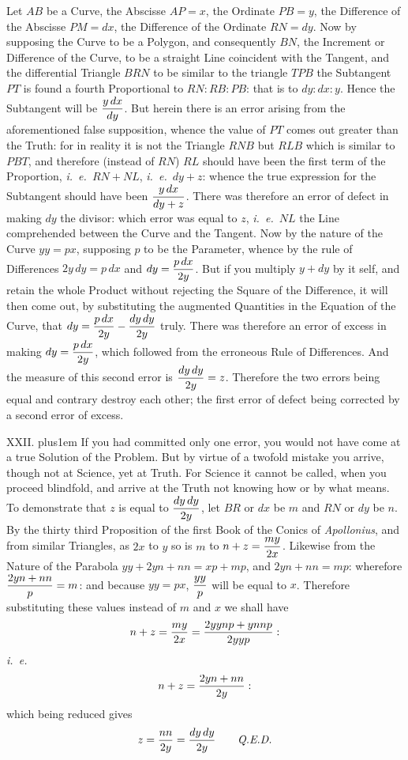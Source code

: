 \noindent
Let $AB$ be a Curve, the Abscisse $AP = x$, the
Ordinate $PB = y$, the Difference of the Abscisse $PM = dx$, the
Difference of the Ordinate $RN = dy$.  Now by supposing the Curve
to be a Polygon, and consequently $BN$, the Increment or
Difference of the Curve, to be a straight Line coincident with
the Tangent, and the differential Triangle $BRN$ to be similar to
the triangle $TPB$ the Subtangent $PT$ is found a fourth
Proportional to $RN : RB : PB$: that is to $dy : dx : y$.  Hence
the Subtangent will be
$\displaystyle {y \,dx \over dy}$.
But herein there is an error arising from the aforementioned
false supposition, whence the value of $PT$ comes out greater
than the Truth: for in reality it is not the Triangle $RNB$ but
$RLB$ which is similar to $PBT$, and therefore (instead of $RN$)
$RL$ should have been the first term of the Proportion,
{\it i.~e.}\ $RN + NL$, {\it i.~e.}\ $dy + z$: whence the true
expression for the Subtangent should have been
$\displaystyle {y\,dx \over dy + z}$.
There was therefore an error of defect in making $dy$ the
divisor: which error was equal to $z$, {\it i.~e.}\ $NL$ the Line
comprehended between the Curve and the Tangent.  Now by the
nature of the Curve $yy=px$, supposing $p$ to be the Parameter,
whence by the rule of Differences $2y\,dy = p\,dx$ and
$\displaystyle dy = {p\,dx \over 2y}$.
But if you multiply $y + dy$ by it self, and retain the whole
Product without rejecting the Square of the Difference, it will
then come out, by substituting the augmented Quantities in the
Equation of the Curve, that
$\displaystyle dy = {p\,dx \over 2y} - {dy\,dy \over 2y}$
truly.  There was therefore an error of excess in making
$\displaystyle dy = {p\,dx \over 2y}$, which followed from the
erroneous Rule of Differences.  And the measure of this second
error is
$\displaystyle {dy\,dy \over 2y} = z$.
Therefore the two errors being equal and contrary destroy each
other; the first error of defect being corrected by a second
error of excess.

\medbreak

XXII. \hskip 0pt plus1em
If you had committed only one error, you would not have come at a
true Solution of the Problem.  But by virtue of a twofold mistake
you arrive, though not at Science, yet at Truth.  For Science it
cannot be called, when you proceed blindfold, and arrive at the
Truth not knowing how or by what means.  To demonstrate that $z$
is equal to
$\displaystyle {dy\,dy \over 2y}$,
let $BR$ or $dx$ be $m$ and $RN$ or $dy$ be $n$.  By the thirty
third Proposition of the first Book of the Conics of {\it
Apollonius}, and from similar Triangles, as $2x$ to $y$ so is $m$
to
$\displaystyle n + z = {my \over 2x}$.
Likewise from the Nature of the Parabola $yy + 2yn + nn = xp +
mp$, and $2yn + nn = mp$: wherefore
$\displaystyle {2yn + nn \over p} = m$:
and because $yy = px$,
$\displaystyle {yy \over p}$
will be equal to $x$.  Therefore substituting these values
instead of $m$ and $x$ we shall have
$$n + z = {my \over 2x} = {2yynp + ynnp \over 2yyp}:$$
{\it i.~e.}
$$n + z = {2yn + nn \over 2y}:$$
which being reduced gives
$$z = {nn \over 2y} = {dy\,dy \over 2y}
   \qquad \hbox{{\it Q.E.D.}}$$

